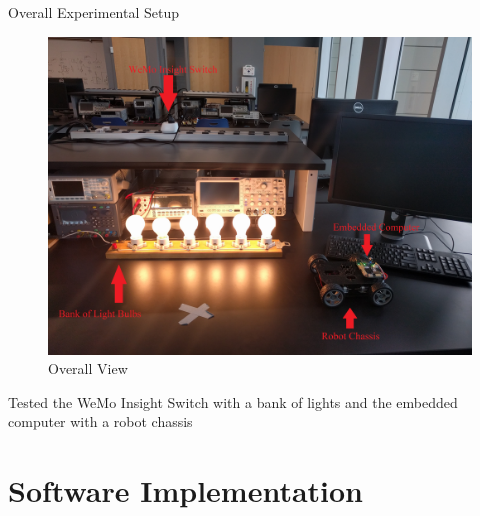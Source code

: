 \documentclass{beamer}
\begin{document}
\begin{frame}{Overall Experimental Setup}{} %
    \begin{figure}
        \centering
        \includegraphics[scale=0.04]{figs/overallView.jpg}
        \caption{Overall View}
        \label{fig:my_label}
    \end{figure}
    \begin{block}{}
      Tested the WeMo Insight Switch with a bank of lights and the embedded computer with a robot chassis
    \end{block}
\end{frame}

\section{Software Implementation}
\end{document}
